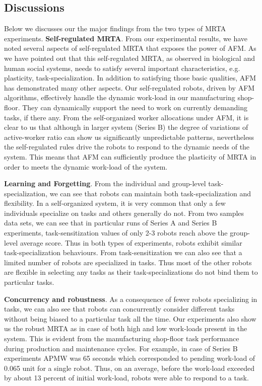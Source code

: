 \documentclass[smallcondensed]{svjour3}
\begin{document}
\subsection{Discussions}
\label{afm:discuss}
Below we discusses our the major findings from the two types of MRTA experiments.
\textbf{Self-regulated MRTA}. From our experimental results, we have noted several aspects of self-regulated MRTA that exposes the power of AFM. As we have pointed out that this self-regulated MRTA, as observed in biological and human social systems, needs to satisfy several important characteristics, e.g. plasticity, task-specialization. In addition to satisfying those basic qualities, AFM has demonstrated many other aspects. Our self-regulated robots, driven by AFM algorithms, effectively handle the dynamic work-load in our manufacturing shop-floor. They can dynamically support the need to work on currently demanding tasks, if there any. From the self-organized worker allocations under AFM, it is clear to us that although in larger system (Series B) the degree of variations of active-worker ratio can show us significantly unpredictable patterns, nevertheless the self-regulated rules drive the robots to respond to the dynamic needs of the system. This means that AFM can sufficiently produce the plasticity of MRTA in order to meets the dynamic work-load of the system.

\textbf{Learning and Forgetting}. From the individual and group-level task-specialization, we can see that robots can maintain both task-specialization and flexibility. In a self-organized system, it is very common that only a few individuals specialize on tasks and others generally do not. From two samples data sets, we can see that in particular runs of Series A and Series B experiments, task-sensitization values of  only 2-3 robots reach above the group-level average score. Thus in both types of experiments, robots exhibit similar task-specialization behaviours. From task-sensitization we can also see that a limited number of robots are specialized in tasks. Thus most of the other robots are flexible in selecting any tasks as their task-specializations do not bind them to particular tasks.

\textbf{Concurrency and robustness}. As a consequence of fewer robots specializing in tasks, we can also see that robots can concurrently  consider different tasks without being biased to a particular task all the time. Our experiments also show us the robust MRTA as in case of  both high and low work-loads present in the system. This is evident from the manufacturing shop-floor task performance during production and maintenance cycles. For example,  in case of Series B experiments APMW was 65 seconds which corresponded  to pending work-load of 0.065 unit for a single robot. Thus, on an average, before the work-load exceeded by about 13 percent of initial work-load, robots were able to respond to  a task.
\end{document}
